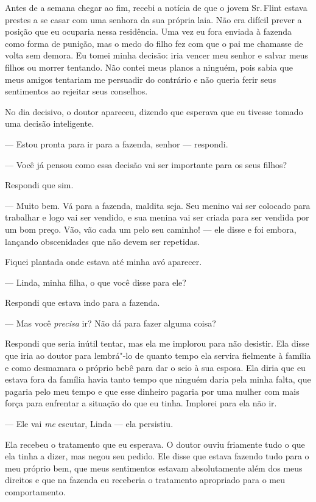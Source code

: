 Antes de a semana chegar ao fim, recebi
a notícia de que o jovem Sr.\,Flint estava prestes a se casar com uma
senhora da sua própria laia. Não era difícil prever a posição que eu
ocuparia nessa residência. Uma vez eu fora enviada à fazenda como forma
de punição, mas o medo do filho fez com que o pai me chamasse de volta
sem demora. Eu tomei minha decisão: iria vencer meu senhor e salvar meus
filhos ou morrer tentando. Não contei meus planos a ninguém, pois sabia
que meus amigos tentariam me persuadir do contrário e não queria ferir
seus sentimentos ao rejeitar seus conselhos.

No dia decisivo, o doutor apareceu,
dizendo que esperava que eu tivesse tomado uma decisão inteligente.

--- Estou pronta para ir para a
fazenda, senhor --- respondi.

--- Você já pensou como essa decisão
vai ser importante para os seus filhos?

Respondi que sim.

--- Muito bem. Vá para a fazenda,
maldita seja. Seu menino vai ser colocado para trabalhar e logo vai ser
vendido, e sua menina vai ser criada para ser vendida por um bom preço.
Vão, vão cada um pelo seu caminho! --- ele disse e foi embora, lançando
obscenidades que não devem ser repetidas.

Fiquei plantada onde estava até minha
avó aparecer.

--- Linda, minha filha, o que você disse para ele?

Respondi que estava indo para a
fazenda.

--- Mas você \emph{precisa} ir? Não dá
para fazer alguma coisa?

Respondi que seria inútil tentar, mas
ela me implorou para não desistir. Ela disse que iria ao doutor para
lembrá"-lo de quanto tempo ela servira fielmente à família e como
desmamara o próprio bebê para dar o seio à sua esposa. Ela diria que eu
estava fora da família havia tanto tempo que ninguém daria pela minha
falta, que pagaria pelo meu tempo e que esse dinheiro pagaria por uma
mulher com mais força para enfrentar a situação do que eu tinha.
Implorei para ela não ir.

--- Ele vai \emph{me} escutar, Linda --- ela persistiu.

Ela recebeu o tratamento que eu esperava. O doutor ouviu friamente tudo
o que ela tinha a dizer, mas negou seu pedido. Ele disse que estava
fazendo tudo para o meu próprio bem, que meus sentimentos estavam
absolutamente além dos meus direitos e que na fazenda eu receberia o
tratamento apropriado para o meu comportamento.

